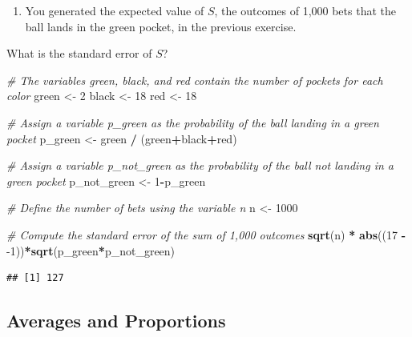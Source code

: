 \documentclass[
]{article}
\newenvironment{Shaded}{\begin{snugshade}}{\end{snugshade}}
\newcommand{\CommentTok}[1]{\textcolor[rgb]{0.56,0.35,0.01}{\textit{#1}}}
\newcommand{\DecValTok}[1]{\textcolor[rgb]{0.00,0.00,0.81}{#1}}
\newcommand{\KeywordTok}[1]{\textcolor[rgb]{0.13,0.29,0.53}{\textbf{#1}}}
\newcommand{\NormalTok}[1]{#1}
\newcommand{\OperatorTok}[1]{\textcolor[rgb]{0.81,0.36,0.00}{\textbf{#1}}}
\newcommand{\StringTok}[1]{\textcolor[rgb]{0.31,0.60,0.02}{#1}}
\providecommand{\tightlist}{%
  \setlength{\itemsep}{0pt}\setlength{\parskip}{0pt}}
\begin{document}
\begin{enumerate}
\def\labelenumi{\arabic{enumi}.}
\setcounter{enumi}{6}
\tightlist
\item
  You generated the expected value of \(S\), the outcomes of 1,000 bets
  that the ball lands in the green pocket, in the previous exercise.
\end{enumerate}

What is the standard error of \(S\)?

\begin{Shaded}
\begin{Highlighting}[]
\CommentTok{\# The variables \textquotesingle{}green\textquotesingle{}, \textquotesingle{}black\textquotesingle{}, and \textquotesingle{}red\textquotesingle{} contain the number of pockets for each color}
\NormalTok{green \textless{}{-}}\StringTok{ }\DecValTok{2}
\NormalTok{black \textless{}{-}}\StringTok{ }\DecValTok{18}
\NormalTok{red \textless{}{-}}\StringTok{ }\DecValTok{18}

\CommentTok{\# Assign a variable \textasciigrave{}p\_green\textasciigrave{} as the probability of the ball landing in a green pocket}
\NormalTok{p\_green \textless{}{-}}\StringTok{ }\NormalTok{green }\OperatorTok{/}\StringTok{ }\NormalTok{(green}\OperatorTok{+}\NormalTok{black}\OperatorTok{+}\NormalTok{red)}

\CommentTok{\# Assign a variable \textasciigrave{}p\_not\_green\textasciigrave{} as the probability of the ball not landing in a green pocket}
\NormalTok{p\_not\_green \textless{}{-}}\StringTok{ }\DecValTok{1}\OperatorTok{{-}}\NormalTok{p\_green}

\CommentTok{\# Define the number of bets using the variable \textquotesingle{}n\textquotesingle{}}
\NormalTok{n \textless{}{-}}\StringTok{ }\DecValTok{1000}

\CommentTok{\# Compute the standard error of the sum of 1,000 outcomes}
\KeywordTok{sqrt}\NormalTok{(n) }\OperatorTok{*}\StringTok{ }\KeywordTok{abs}\NormalTok{((}\DecValTok{17} \OperatorTok{{-}}\StringTok{ }\DecValTok{{-}1}\NormalTok{))}\OperatorTok{*}\KeywordTok{sqrt}\NormalTok{(p\_green}\OperatorTok{*}\NormalTok{p\_not\_green)}
\end{Highlighting}
\end{Shaded}

\begin{verbatim}
## [1] 127
\end{verbatim}

\hypertarget{averages-and-proportions}{%
\subsection{Averages and Proportions}\label{averages-and-proportions}}
\end{document}
